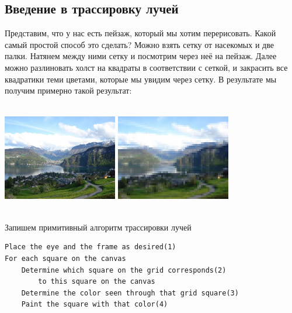 
\subsection{Введение в трассировку лучей}\label{1}

Представим, что у нас есть пейзаж, который мы хотим перерисовать. Какой самый простой способ это сделать?
Можно взять сетку от насекомых и две палки. Натянем между ними сетку и посмотрим через неё на пейзаж. Далее можно разлиновать холст на квадраты в соответствии с сеткой, и закрасить все квадратики теми цветами, которые мы увидим через сетку.
В результате мы получим примерно такой результат:

\includegraphics[width=5cm, height=4.8cm]{image1.png}
\includegraphics[width=5cm, height=4.8cm]{image2.png}

Запишем примитивный алгоритм трассировки лучей
\begin{lstlisting}
Place the eye and the frame as desired(1)
For each square on the canvas
    Determine which square on the grid corresponds(2) 
        to this square on the canvas
    Determine the color seen through that grid square(3)
    Paint the square with that color(4)
\end{lstlisting}

